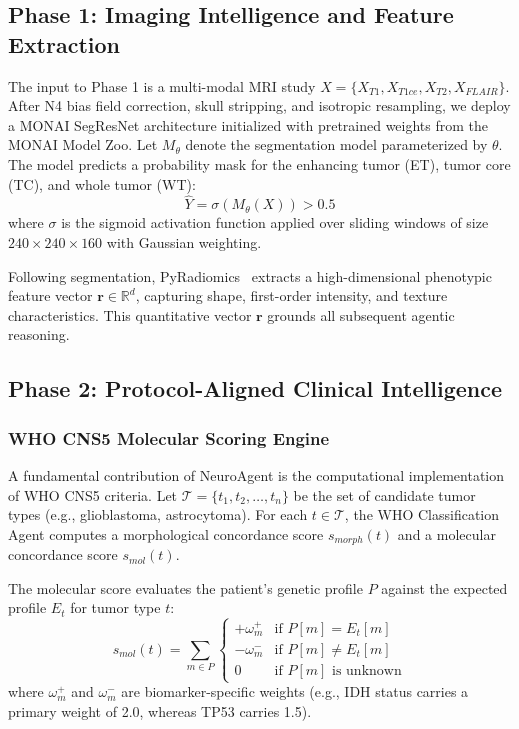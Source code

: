 \subsection{Phase 1: Imaging Intelligence and Feature Extraction}

The input to Phase 1 is a multi-modal MRI study $X = \{X_{T1}, X_{T1ce}, X_{T2}, X_{FLAIR}\}$. 
After N4 bias field correction, skull stripping, and isotropic resampling, we deploy a MONAI SegResNet architecture initialized with pretrained weights from the MONAI Model Zoo. Let $M_\theta$ denote the segmentation model parameterized by $\theta$. The model predicts a probability mask for the enhancing tumor (ET), tumor core (TC), and whole tumor (WT):
\begin{equation}
\hat{Y} = \sigma(M_\theta(X)) > 0.5
\end{equation}
where $\sigma$ is the sigmoid activation function applied over sliding windows of size $240 \times 240 \times 160$ with Gaussian weighting. 

Following segmentation, PyRadiomics~\cite{vangriethuysen2017radiomics} extracts a high-dimensional phenotypic feature vector $\mathbf{r} \in \mathbb{R}^{d}$, capturing shape, first-order intensity, and texture characteristics. This quantitative vector $\mathbf{r}$ grounds all subsequent agentic reasoning.

\subsection{Phase 2: Protocol-Aligned Clinical Intelligence}

\subsubsection{WHO CNS5 Molecular Scoring Engine}
A fundamental contribution of NeuroAgent is the computational implementation of WHO CNS5 criteria. Let $\mathcal{T} = \{t_1, t_2, \dots, t_n\}$ be the set of candidate tumor types (e.g., glioblastoma, astrocytoma). For each $t \in \mathcal{T}$, the WHO Classification Agent computes a morphological concordance score $s_{morph}(t)$ and a molecular concordance score $s_{mol}(t)$.

The molecular score evaluates the patient's genetic profile $P$ against the expected profile $E_t$ for tumor type $t$:
\begin{equation}
s_{mol}(t) = \sum_{m \in P} \begin{cases} 
+\omega_{m}^+ & \text{if } P[m] = E_t[m] \\
-\omega_{m}^- & \text{if } P[m] \neq E_t[m] \\
0 & \text{if } P[m] \text{ is unknown}
\end{cases}
\end{equation}
where $\omega_{m}^+$ and $\omega_{m}^-$ are biomarker-specific weights (e.g., IDH status carries a primary weight of 2.0, whereas TP53 carries 1.5).

